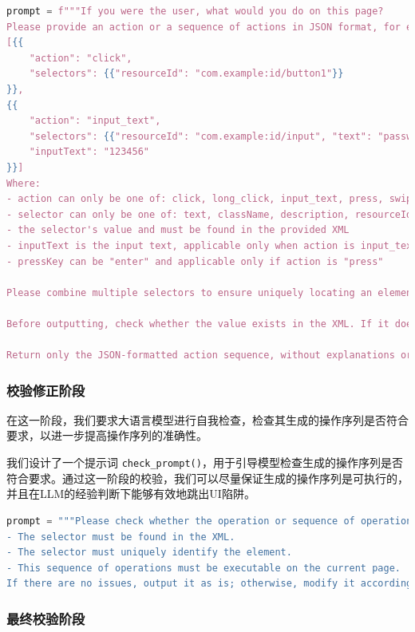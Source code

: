 \documentclass{article}
\begin{document}
\begin{lstlisting}[language=Python]
prompt = f"""If you were the user, what would you do on this page?
Please provide an action or a sequence of actions in JSON format, for example:
[{{
    "action": "click",
    "selectors": {{"resourceId": "com.example:id/button1"}}
}},
{{
    "action": "input_text",
    "selectors": {{"resourceId": "com.example:id/input", "text": "password"}}
    "inputText": "123456"
}}]
Where:
- action can only be one of: click, long_click, input_text, press, swipe, scroll
- selector can only be one of: text, className, description, resourceId (must be in camelCase); choose the selector that uniquely identifies the element
- the selector's value and must be found in the provided XML
- inputText is the input text, applicable only when action is input_text
- pressKey can be "enter" and applicable only if action is "press"

Please combine multiple selectors to ensure uniquely locating an element.

Before outputting, check whether the value exists in the XML. If it does not exist, modify the action accordingly.

Return only the JSON-formatted action sequence, without explanations or code blocks."""
\end{lstlisting}

\subsubsection{校验修正阶段} 

在这一阶段，我们要求大语言模型进行自我检查，检查其生成的操作序列是否符合要求，以进一步提高操作序列的准确性。

我们设计了一个提示词 \texttt{check\_prompt()}，用于引导模型检查生成的操作序列是否符合要求。通过这一阶段的校验，我们可以尽量保证生成的操作序列是可执行的，并且在LLM的经验判断下能够有效地跳出UI陷阱。


\begin{lstlisting}[language=Python]
prompt = """Please check whether the operation or sequence of operations you just generated meets the requirements:
- The selector must be found in the XML.
- The selector must uniquely identify the element.
- This sequence of operations must be executable on the current page.
If there are no issues, output it as is; otherwise, modify it accordingly."""
\end{lstlisting}

\subsubsection{最终校验阶段} 
\end{document}
